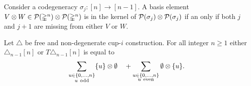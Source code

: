 \begin{lemma} \label{l:condition to be in the kernel of sxs}
	Consider a codegeneracy $\sigma_j \colon [n] \to [n-1]$.
	A basis element $V \otimes W \in \mathcal{P}(\mathbb{\Delta}^n) \otimes \mathcal{P}(\mathbb{\Delta}^n)$ is in the kernel of $\mathcal{P}(\sigma_j) \otimes \mathcal{P}(\sigma_j)$ if an only if both $j$ and $j+1$ are missing from either $V$ or $W$.
\end{lemma}


\begin{lemma}
	Let $\triangle$ be free and non-degenerate cup-$i$ construction.
	For all integer $n \geq 1$ either $\triangle_{n-1} [n]$ or $T \triangle_{n-1} [n]$ is equal to
	\[
	\sum_{\substack{u \in \{0,\dots,n\} \\ u \ \mathrm{odd}}} \{u\} \otimes \emptyset
	\quad +
	\sum_{\substack{u \in \{0,\dots,n\} \\ u \ \mathrm{even}}} \emptyset \otimes \{u\}.
	\]
\end{lemma}

%
